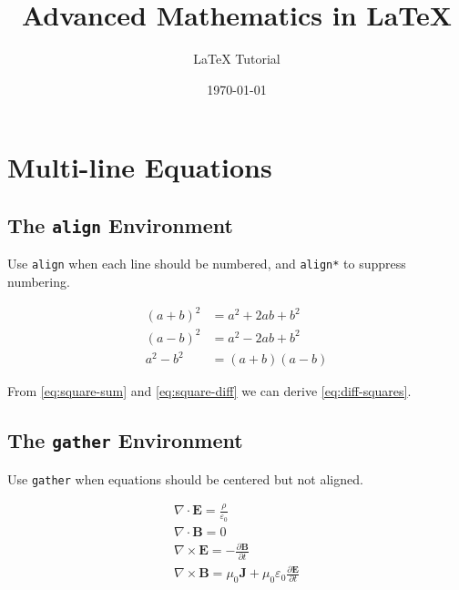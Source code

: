 \documentclass[12pt]{article}
\title{Advanced Mathematics in \LaTeX{}}
\author{LaTeX Tutorial}
\date{\today}
\theoremstyle{plain}
\theoremstyle{definition}
\theoremstyle{remark}
\begin{document}
\maketitle
\tableofcontents
\newpage

\section{Multi-line Equations}

\subsection{The \texttt{align} Environment}

Use \texttt{align} when each line should be numbered, and \texttt{align*}
to suppress numbering.

\begin{align}
    (a + b)^2 &= a^2 + 2ab + b^2       \label{eq:square-sum} \\
    (a - b)^2 &= a^2 - 2ab + b^2       \label{eq:square-diff} \\
    a^2 - b^2 &= (a+b)(a-b)            \label{eq:diff-squares}
\end{align}

From \eqref{eq:square-sum} and \eqref{eq:square-diff} we can derive
\eqref{eq:diff-squares}.

\subsection{The \texttt{gather} Environment}

Use \texttt{gather} when equations should be centered but not aligned.

\begin{gather}
    \nabla \cdot \mathbf{E} = \frac{\rho}{\varepsilon_0} \\
    \nabla \cdot \mathbf{B} = 0 \\
    \nabla \times \mathbf{E} = -\frac{\partial \mathbf{B}}{\partial t} \\
    \nabla \times \mathbf{B} = \mu_0 \mathbf{J}
        + \mu_0 \varepsilon_0 \frac{\partial \mathbf{E}}{\partial t}
\end{gather}

\end{document}
